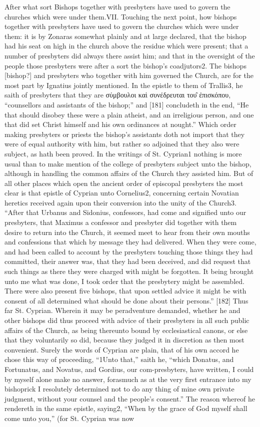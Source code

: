 After what sort Bishops together with presbyters have used to govern the churches which were under them.VII. Touching the next point, how bishops together with presbyters have used to govern the churches which were under them: it is by Zonaras somewhat plainly and at large declared, that the bishop had his seat on high in the church above the residue which were present; that a number of presbyters did always there assist him; and that in the oversight of the people those presbyters were after a sort the bishop’s coadjutors2. The bishops [bishop?] and presbyters who together with him governed the Church, are for the most part by Ignatius jointly mentioned. In the epistle to them of Trallis3, he saith of presbyters that they are σύμβουλοι καὶ συνέδρευται του̑ ἐπισκόπου, “counsellors and assistants of the bishop;” and [181] concludeth in the end, “He that should disobey these were a plain atheist, and an irreligious person, and one that did set Christ himself and his own ordinances at nought.” Which order making presbyters or priests the bishop’s assistants doth not import that they were of equal authority with him, but rather so adjoined that they also were subject, as hath been proved. In the writings of St. Cyprian1 nothing is more usual than to make mention of the college of presbyters subject unto the bishop, although in handling the common affairs of the Church they assisted him. But of all other places which open the ancient order of episcopal presbyters the most clear is that epistle of Cyprian unto Cornelius2, concerning certain Novatian heretics received again upon their conversion into the unity of the Church3. “After that Urbanus and Sidonius, confessors, had come and signified unto our presbyters, that Maximus a confessor and presbyter did together with them desire to return into the Church, it seemed meet to hear from their own mouths and confessions that which by message they had delivered. When they were come, and had been called to account by the presbyters touching those things they had committed, their answer was, that they had been deceived, and did request that such things as there they were charged with might be forgotten. It being brought unto me what was done, I took order that the presbytery might be assembled. There were also present five bishops, that upon settled advice it might be with consent of all determined what should be done about their persons.” [182] Thus far St. Cyprian. Wherein it may be peradventure demanded, whether he and other bishops did thus proceed with advice of their presbyters in all such public affairs of the Church, as being thereunto bound by ecclesiastical canons, or else that they voluntarily so did, because they judged it in discretion as then most convenient. Surely the words of Cyprian are plain, that of his own accord he chose this way of proceeding, “1Unto that,” saith he, “which Donatus, and Fortunatus, and Novatus, and Gordius, our com-presbyters, have written, I could by myself alone make no answer, forasmuch as at the very first entrance into my bishoprick I resolutely determined not to do any thing of mine own private judgment, without your counsel and the people’s consent.” The reason whereof he rendereth in the same epistle, saying2, “When by the grace of God myself shall come unto you,” (for St. Cyprian was now 